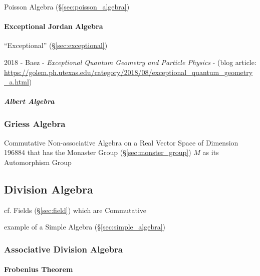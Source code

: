 Poisson Algebra (\S\ref{sec:poisson_algebra})



\paragraph{Exceptional Jordan Algebra}\label{sec:exceptional_jordan_algebra}
\hfill

``Exceptional'' (\S\ref{sec:exceptional})

2018 - Baez - \emph{Exceptional Quantum Geometry and Particle Physics} - (blog
article:
\url{https://golem.ph.utexas.edu/category/2018/08/exceptional_quantum_geometry_a.html})



\subparagraph{Albert Algebra}\label{sec:albert_algebra}\hfill



\subsubsection{Griess Algebra}\label{sec:griess_algebra}

Commutative Non-associative Algebra on a Real Vector Space of Dimension 196884
that has the Monaster Group (\S\ref{sec:monster_group}) $M$ as its Automorphism
Group



\subsection{Division Algebra}\label{sec:division_algebra}

cf. Fields (\S\ref{sec:field}) which are Commutative

example of a Simple Algebra (\S\ref{sec:simple_algebra})



\subsubsection{Associative Division Algebra}
\label{sec:associative_division_algebra}

\paragraph{Frobenius Theorem}\label{sec:frobenius_theorem}\hfill

